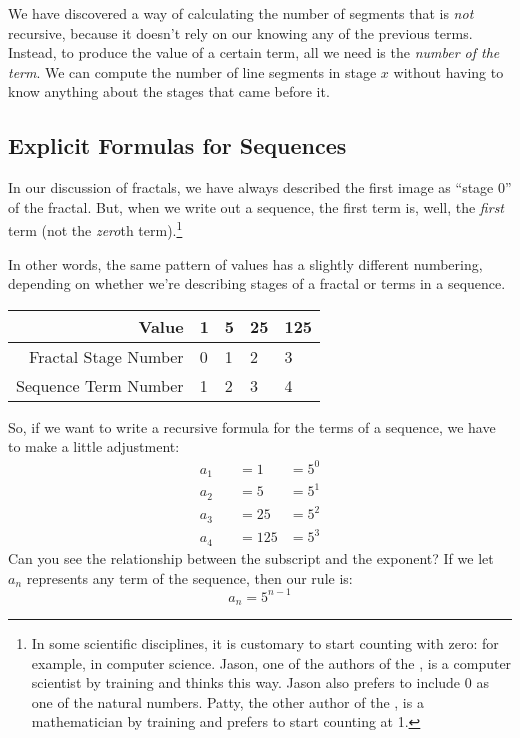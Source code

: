We have discovered a way of calculating the number of segments that is \textit{not} recursive, because it doesn't rely on our knowing any of the previous terms. Instead, to produce the value of a certain term, all we need is the \textit{number of the term}. We can compute the number of line segments in stage $x$ without having to know anything about the stages that came before it.

\subsection{Explicit Formulas for Sequences}

In our discussion of fractals, we have always described the first image as ``stage 0'' of the fractal. But, when we write out a sequence, the first term is, well, the \textit{first} term (not the \textit{zero}th term).\footnote{In some scientific disciplines, it is customary to start counting with zero: for example, in computer science. Jason, one of the authors of the \algebranomicon, is a computer scientist by training and thinks this way. Jason also prefers to include 0 as one of the natural numbers. Patty, the other author of the \algebranomicon, is a mathematician by training and prefers to start counting at 1.}

In other words, the same pattern of values has a slightly different numbering, depending on whether we're describing stages of a fractal or terms in a sequence.

\begin{center}\begin{tabular}{rC{0.75cm}C{0.75cm}C{0.75cm}C{0.75cm}}
Value & {1} & {5} & {25} & {125}
\\\hline
Fractal Stage Number & 0 & 1 & 2 & 3
\\
Sequence Term Number & 1 & 2 & 3 & 4
\end{tabular}\end{center}

So, if we want to write a recursive formula for the terms of a sequence, we have to make a little adjustment:
\[\begin{aligned}
a_1 &\quad= 1 &= 5^0
\\
a_2 &\quad= 5 &= 5^1
\\
a_3 &\quad= 25 &= 5^2
\\
a_4 &\quad= 125 &= 5^3
\end{aligned}
\]
Can you see the relationship between the subscript and the exponent? If we let $a_n$ represents any term of the sequence, then our rule is:
\[a_n = 5^{n-1}\]

